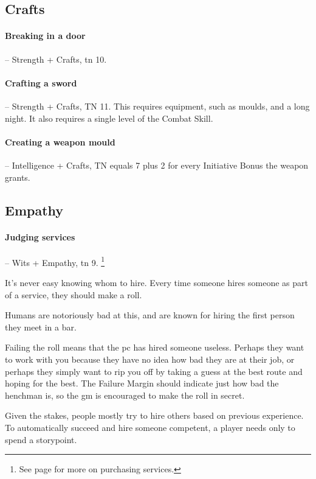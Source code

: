 \begin{multicols}{2}
\subsection{Crafts}

\paragraph{Breaking in a door} -- Strength + Crafts, \gls{tn} 10.

\paragraph{Crafting a sword} -- Strength + Crafts, TN 11.
This requires equipment, such as moulds, and a long night.
It also requires a single level of the Combat Skill.

\paragraph{Creating a weapon mould} -- Intelligence + Crafts, TN equals 7 plus 2 for every Initiative Bonus the weapon grants.

\subsection{Empathy}

\paragraph{Judging services} -- Wits + Empathy, \gls{tn} 9.
\footnote{See page \pageref{servicse} for more on purchasing services.}

It's never easy knowing whom to hire.
Every time someone hires someone as part of a service, they should make a roll.

Humans are notoriously bad at this, and are known for hiring the first person they meet in a bar.

Failing the roll means that the \gls{pc} has hired someone useless.
Perhaps they want to work with you because they have no idea how bad they are at their job, or perhaps they simply want to rip you off by taking a guess at the best route and hoping for the best.
The Failure Margin should indicate just how bad the henchman is, so the \gls{gm} is encouraged to make the roll in secret.

Given the stakes, people mostly try to hire others based on previous experience.
To automatically succeed and hire someone competent, a player needs only to spend a \gls{storypoint}.


\end{multicols}
